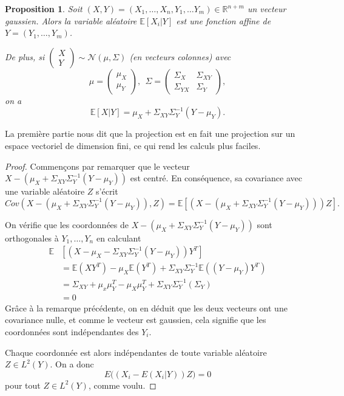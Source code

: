 \documentclass[a4paper,12pt]{book}
\newtheorem{propfr}[thmfr]{Proposition}
\newcommand{\E}{\mathbb{E}}
\begin{document}
\begin{propfr}
\label{prop:cond_gauss}
Soit $(X,Y)=(X_1,\ldots,X_n,Y_1,\ldots Y_m)\in \mathbb{R}^{n+m}$ un vecteur gaussien. Alors la variable aléatoire $\mathbb{E}[X_i|Y]$ est une fonction affine de $Y=(Y_1,\ldots,Y_m)$.

De plus, si $\left(\begin{array}{c}
X\\
Y
\end{array}\right)\sim\mathcal{N}(\mu,\Sigma)$ (en vecteurs colonnes) avec
$$\mu=\left(\begin{array}{c}
\mu_X\\
\mu_Y
\end{array} \right),\ \ \Sigma=\left(\begin{array}{cc}
\Sigma_X& \Sigma_{XY}\\
\Sigma_{YX}& \Sigma_Y
\end{array}\right), $$
on a
$$\mathbb{E}[X|Y]=\mu_X+\Sigma_{XY}\Sigma_Y^{-1}(Y-\mu_Y).$$
\end{propfr}
La première partie nous dit que la projection est en fait une projection sur un espace vectoriel de dimension fini, ce qui rend les calculs plus faciles.
\begin{proof}
Commençons par remarquer que le vecteur $X-\left(\mu_X+\Sigma_{XY}\Sigma_Y^{-1}(Y-\mu_Y)\right)$ est centré.
En conséquence, sa covariance avec une variable aléatoire $Z$ s'écrit
$$Cov(X-\left(\mu_X+\Sigma_{XY}\Sigma_Y^{-1}(Y-\mu_Y)\right), Z)=\E\left[(X-\left(\mu_X+\Sigma_{XY}\Sigma_Y^{-1}(Y-\mu_Y)\right))Z\right].$$

On vérifie que les coordonnées de $X-\left(\mu_X+\Sigma_{XY}\Sigma_Y^{-1}(Y-\mu_Y)\right)$ sont orthogonales à $Y_1,\ldots,Y_n$ en calculant
\begin{align*}
\mathbb{E}&\left[\left(X-\mu_X-\Sigma_{XY}\Sigma_Y^{-1}(Y-\mu_Y)\right) Y^T\right]\\
&=\E (X Y^T)-\mu_X\E(Y^T)+\Sigma_{XY}\Sigma_Y^{-1}\E((Y-\mu_Y)Y^T)\\
&=\Sigma_{XY}+\mu_x\mu_Y^T-\mu_X\mu_Y^T+\Sigma_{XY}\Sigma_Y^{-1}(\Sigma_Y)\\
&=0
\end{align*}
Grâce à la remarque précédente, on en déduit que les deux vecteurs ont une covariance nulle, et comme le vecteur est gaussien, cela signifie que les coordonnées sont indépendantes des $Y_i$.

Chaque coordonnée est alors indépendantes de toute variable aléatoire $Z\in L^2(Y)$. On a donc
$$E\big((X_i-E(X_i|Y))Z\big)=0$$
pour tout $Z\in L^2(Y)$, comme voulu.
\end{proof}
\end{document}
